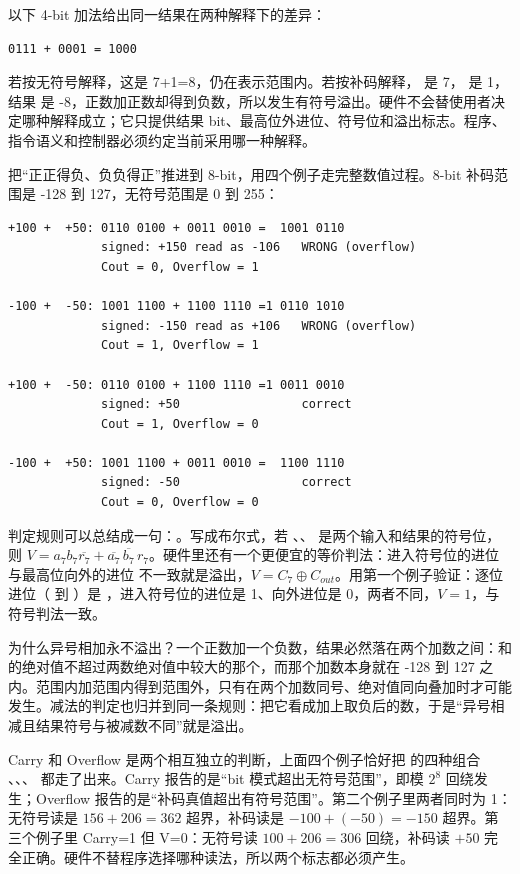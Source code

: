 以下 4-bit 加法给出同一结果在两种解释下的差异：

\begin{lstlisting}
0111 + 0001 = 1000
\end{lstlisting}

若按无符号解释，这是 7+1=8，仍在表示范围内。若按补码解释， 是 7， 是 1，结果  是 -8，正数加正数却得到负数，所以发生有符号溢出。硬件不会替使用者决定哪种解释成立；它只提供结果 bit、最高位外进位、符号位和溢出标志。程序、指令语义和控制器必须约定当前采用哪一种解释。

把“正正得负、负负得正”推进到 8-bit，用四个例子走完整数值过程。8-bit 补码范围是 -128 到 127，无符号范围是 0 到 255：

\begin{lstlisting}
+100 +  +50: 0110 0100 + 0011 0010 =  1001 0110
             signed: +150 read as -106   WRONG (overflow)
             Cout = 0, Overflow = 1

-100 +  -50: 1001 1100 + 1100 1110 =1 0110 1010
             signed: -150 read as +106   WRONG (overflow)
             Cout = 1, Overflow = 1

+100 +  -50: 0110 0100 + 1100 1110 =1 0011 0010
             signed: +50                 correct
             Cout = 1, Overflow = 0

-100 +  +50: 1001 1100 + 0011 0010 =  1100 1110
             signed: -50                 correct
             Cout = 0, Overflow = 0
\end{lstlisting}

判定规则可以总结成一句：。写成布尔式，若 、、 是两个输入和结果的符号位，则 $V = a_7 b_7 \overline{r_7} + \overline{a_7}\,\overline{b_7}\, r_7$。硬件里还有一个更便宜的等价判法：进入符号位的进位  与最高位向外的进位  不一致就是溢出，$V = C_7 \oplus C_{out}$。用第一个例子验证：逐位进位（ 到 ）是 ，进入符号位的进位是 1、向外进位是 0，两者不同，$V=1$，与符号判法一致。

为什么异号相加永不溢出？一个正数加一个负数，结果必然落在两个加数之间：和的绝对值不超过两数绝对值中较大的那个，而那个加数本身就在 -128 到 127 之内。范围内加范围内得到范围外，只有在两个加数同号、绝对值同向叠加时才可能发生。减法的判定也归并到同一条规则：把它看成加上取负后的数，于是“异号相减且结果符号与被减数不同”就是溢出。

Carry 和 Overflow 是两个相互独立的判断，上面四个例子恰好把  的四种组合 、、、 都走了出来。Carry 报告的是“bit 模式超出无符号范围”，即模 $2^{8}$ 回绕发生；Overflow 报告的是“补码真值超出有符号范围”。第二个例子里两者同时为 1：无符号读是 $156+206=362$ 超界，补码读是 $-100+(-50)=-150$ 超界。第三个例子里 Carry=1 但 V=0：无符号读 $100+206=306$ 回绕，补码读 $+50$ 完全正确。硬件不替程序选择哪种读法，所以两个标志都必须产生。

